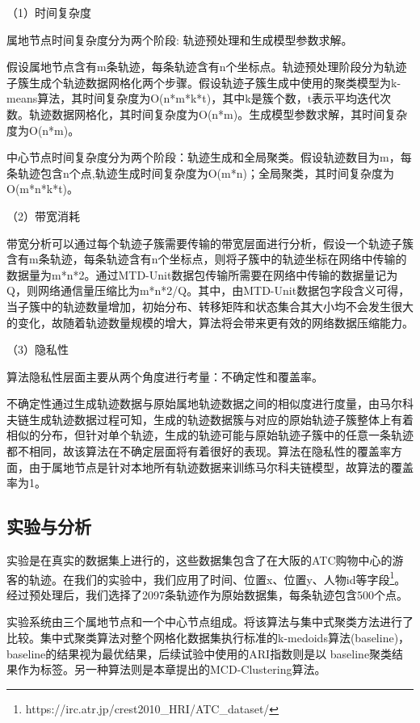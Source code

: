 （1）时间复杂度

属地节点时间复杂度分为两个阶段: 轨迹预处理和生成模型参数求解。

假设属地节点含有m条轨迹，每条轨迹含有n个坐标点。轨迹预处理阶段分为轨迹子簇生成个轨迹数据网格化两个步骤。假设轨迹子簇生成中使用的聚类模型为k-means算法，其时间复杂度为O(n*m*k*t)，其中k是簇个数，t表示平均迭代次数。轨迹数据网格化，其时间复杂度为O(n*m)。生成模型参数求解，其时间复杂度为O(n*m)。

中心节点时间复杂度分为两个阶段：轨迹生成和全局聚类。假设轨迹数目为m，每条轨迹包含n个点,轨迹生成时间复杂度为O(m*n)；全局聚类，其时间复杂度为O(m*n*k*t)。

（2）带宽消耗

带宽分析可以通过每个轨迹子簇需要传输的带宽层面进行分析，假设一个轨迹子簇含有m条轨迹，每条轨迹含有n个坐标点，则将子簇中的轨迹坐标在网络中传输的数据量为m*n*2。通过MTD-Unit数据包传输所需要在网络中传输的数据量记为Q，则网络通信量压缩比为m*n*2/Q。其中，由MTD-Unit数据包字段含义可得，当子簇中的轨迹数量增加，初始分布、转移矩阵和状态集合其大小均不会发生很大的变化，故随着轨迹数量规模的增大，算法将会带来更有效的网络数据压缩能力。

（3）隐私性

算法隐私性层面主要从两个角度进行考量：不确定性和覆盖率。

不确定性通过生成轨迹数据与原始属地轨迹数据之间的相似度进行度量，由马尔科夫链生成轨迹数据过程可知，生成的轨迹数据簇与对应的原始轨迹子簇整体上有着相似的分布，但针对单个轨迹，生成的轨迹可能与原始轨迹子簇中的任意一条轨迹都不相同，故该算法在不确定层面将有着很好的表现。算法在隐私性的覆盖率方面，由于属地节点是针对本地所有轨迹数据来训练马尔科夫链模型，故算法的覆盖率为1。

\subsection{实验与分析}

实验是在真实的数据集上进行的，这些数据集包含了在大阪的ATC购物中心的游客的轨迹。在我们的实验中，我们应用了时间、位置x、位置y、人物id等字段\footnote[1]{https://irc.atr.jp/crest2010_HRI/ATC_dataset/}。经过预处理后，我们选择了2097条轨迹作为原始数据集，每条轨迹包含500个点。

实验系统由三个属地节点和一个中心节点组成。将该算法与集中式聚类方法进行了比较。集中式聚类算法对整个网格化数据集执行标准的k-medoids算法(baseline)， baseline的结果视为最优结果，后续试验中使用的ARI指数则是以 baseline聚类结果作为标签。另一种算法则是本章提出的MCD-Clustering算法。

